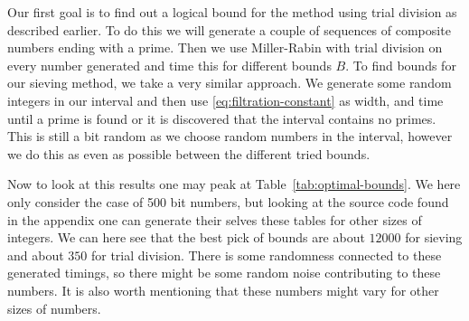   Our first goal is to find out a logical bound for the method using trial division as described earlier.
  To do this we will generate a couple of sequences of composite numbers ending with a prime.
  Then we use Miller-Rabin with trial division on every number generated and time this for different bounds $B$.
  To find bounds for our sieving method, we take a very similar approach.
  We generate some random integers in our interval and then use \eqref{eq:filtration-constant} as width, and time until a prime is found or it is discovered that the interval contains no primes.
  This is still a bit random as we choose random numbers in the interval, however we do this as even as possible between the different tried bounds.


  Now to look at this results one may peak at Table~\ref{tab:optimal-bounds}.
  We here only consider the case of 500 bit numbers, but looking at the source code found in the appendix one can generate their selves these tables for other sizes of integers.
  We can here see that the best pick of bounds are about $12000$ for sieving and about $350$ for trial division.
  There is some randomness connected to these generated timings, so there might be some random noise contributing to these numbers.
  It is also worth mentioning that these numbers might vary for other sizes of numbers.

